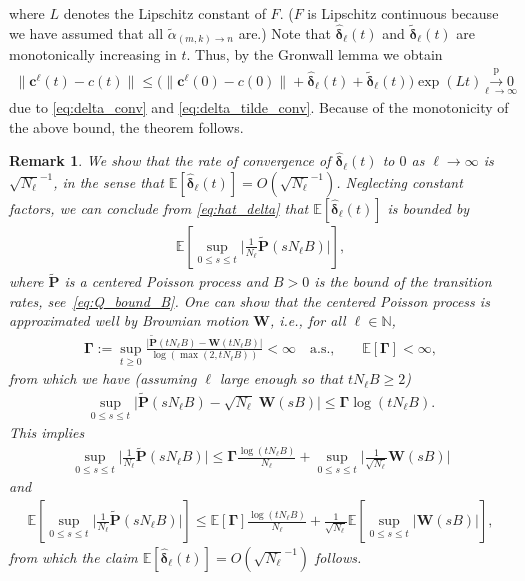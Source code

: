 \documentclass[a4paper,
               10pt,
               pdftex,
               normalheadings,
               headsepline,
               footsepline,
               headinclude,
               footinclude,
               DIV=14,
               abstracton]
{scrartcl}
\newtheorem{remark}[theorem]{Remark}
\newcommand{\rv}[1]{\bm{#1}}
\newcommand{\toprob}{\overset{\mathrm{p}}{\longrightarrow}}
\newcommand{\review}[1]{{#1}}
\begin{document}
where $L$ denotes the Lipschitz constant of $F$. ($F$ is Lipschitz continuous because we have assumed that all $\tilde{\alpha}_{(m,k)\to n}$ are.)
Note that $\hat{\rv{\delta}}_\ell(t)$ and $\rv{\tilde{\delta}}_\ell(t)$ are monotonically increasing in $t$. Thus, by the Gronwall lemma we obtain
\begin{align}
    \lVert \rv{c}^\ell(t) - c(t) \rVert \leq \Big(\lVert \rv{c}^\ell(0) - c(0) \rVert + \hat{\rv{\delta}}_\ell(t) + \rv{\tilde{\delta}}_\ell(t) \Big) \exp(L t) \underset{\ell \to \infty}{\toprob 0} \label{eq:approx_quality}
\end{align}
due to \eqref{eq:delta_conv} and \eqref{eq:delta_tilde_conv}.
Because of the monotonicity of the above bound, the theorem follows.

\review{
\begin{remark} \label{remark_appendix_convergence}
    We show that the rate of convergence of $\hat{\rv{\delta}}_\ell(t)$ to $0$ as $\ell \to \infty$ is $\sqrt{N_\ell}^{-1}$, in the sense that $\mathbb{E}[\hat{\rv{\delta}}_\ell(t)] =  O(\sqrt{N_\ell}^{-1})$.
    Neglecting constant factors, we can conclude from \eqref{eq:hat_delta} that $\mathbb{E}[\hat{\rv{\delta}}_\ell(t)]$ is bounded by 
    \begin{align}
        \mathbb{E}\left[\sup_{0 \leq s \leq t} \Big\lvert \frac{1}{N_\ell} \rv{\tilde{P}} (s N_\ell B) \Big\rvert\right],
    \end{align}
    where $\rv{\tilde{P}}$ is a centered Poisson process and $B>0$ is the bound of the transition rates, see~\eqref{eq:Q_bound_B}.
    One can show \cite[Lemma~1.3]{Anderson2011} that the centered Poisson process is approximated well by Brownian motion $\rv{W}$, i.e., for all $\ell \in \mathbb{N}$,
    \begin{align}
        \rv{\Gamma} := \sup_{t \geq 0} \frac{\lvert \rv{\tilde{P}}(t N_\ell B) - \rv{W}(t N_\ell B) \rvert}{\log(\max(2,t N_\ell B))} < \infty \quad \text{a.s.,} \qquad \mathbb{E}[\rv{\Gamma}] < \infty,
    \end{align}
    from which we have (assuming $\ell$ large enough so that $tN_\ell B \geq 2$) 
    \begin{align}
        \sup_{0\leq s \leq t} \Big\lvert \rv{\tilde{P}} (s N_\ell B) - \sqrt{N_\ell}\; \rv{W}(sB) \Big\rvert \leq \rv{\Gamma} \log(t N_\ell B).
    \end{align}
    This implies
    \begin{align}
        \sup_{0 \leq s \leq t} \Big\lvert \frac{1}{N_\ell} \rv{\tilde{P}} (s N_\ell B) \Big\rvert 
        \leq \rv{\Gamma} \frac{\log(t N_\ell B)}{N_\ell} + \sup_{0 \leq s \leq t} \Big\lvert \frac{1}{\sqrt{N_\ell}} \rv{W}(sB) \Big\rvert
    \end{align}
    and
    \begin{align}
        \mathbb{E}\left[\sup_{0 \leq s \leq t} \Big\lvert \frac{1}{N_\ell} \rv{\tilde{P}} (s N_\ell B) \Big\rvert\right] \leq \mathbb{E}[\rv{\Gamma}] \frac{\log(t N_\ell B)}{N_\ell} + \frac{1}{\sqrt{N_\ell}} \mathbb{E}\left[\sup_{0 \leq s \leq t} \lvert \rv{W}(sB) \rvert\right],
    \end{align}
    from which the claim $\mathbb{E}[\hat{\rv{\delta}}_\ell(t)] =  O(\sqrt{N_\ell}^{-1})$ follows.
\end{remark}
}
\end{document}

